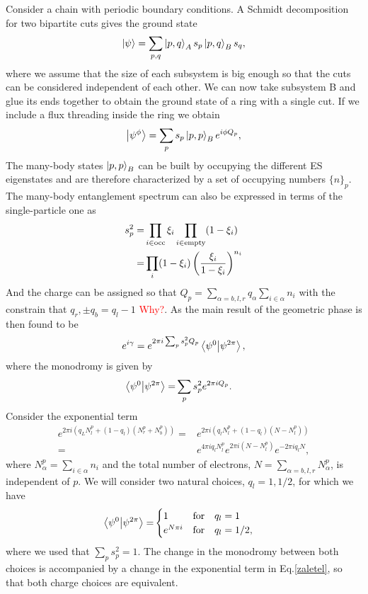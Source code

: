 \documentclass[prb,twocolumn,amsmath,amssymb,superscriptaddress]{revtex4-1}
\begin{document}
Consider a chain with periodic boundary conditions. A Schmidt decomposition for two bipartite cuts gives the ground state
\begin{equation}
\ket{\psi} = \sum_{p,q} \ket{p,q}_A s_p \ket{p,q}_B s_q,
\end{equation}
where we assume that the size of each subsystem is big enough so that the cuts can be considered independent of each other. We can now take subsystem B and glue its ends together to obtain the ground state of a ring with a single cut. If we include a flux threading inside the ring we obtain
\begin{equation}
\ket{\psi^\phi} = \sum_p s_p \ket{p,p}_B e^{i\phi Q_p},
\end{equation}
The many-body states $\ket{p,p}_B$ can be built by occupying the different ES eigenstates and are therefore characterized by a set of occupying numbers $\{n\}_p$. The many-body entanglement spectrum can also be expressed in terms of the single-particle one \cite{Alexandrinata2011} as
\begin{align}
s_p^2 =& \prod_{i \in {\rm occ}} \xi_i \prod_{i \in {\rm empty}}(1-\xi_i) \\
=& \prod_i (1-\xi_i)\left(\frac{\xi_i}{1-\xi_i} \right)^{n_i}
\end{align}
And the charge can be assigned so that $Q_p = \sum_{\alpha = b,l,r} q_\alpha\sum_{i \in \alpha} n_i$ with the constrain that $q_r,\pm q_b = q_l-1$ \textcolor{red}{Why?}. As the main result of \cite{Zaletel2014} the geometric phase is then found to be
\begin{align}
e^{i\gamma} = e^{2\pi i \sum_p s_p^2 Q_p}  \bra{\psi^0}\ket{\psi^{2\pi}},
\label{zaletel}
\end{align}
where the monodromy is given by
\begin{align}
\bra{\psi^0}\ket{\psi^{2\pi}} =& \sum_p s_p^2 e^{2\pi i Q_p}.
\end{align}
Consider the exponential term
\begin{align*}
e^{2\pi i (q_L N^p_l + (1-q_l)(N^p_r+N^p_b))} =& e^{2\pi i (q_l N^p_l + (1-q_l)(N-N^p_l))} \\
=& e^{4\pi i q_l N^p_l}e^{2 \pi i (N-N^p_l)}e^{-2\pi i q_l N },
\end{align*}
where $N^p_\alpha = \sum_{i \in \alpha} n_i$ and the total number of electrons, $N = \sum_{\alpha = b,l,r} N^p_\alpha$, is independent of $p$. We will consider two natural choices, $q_l = 1,1/2$, for which we have
\begin{align}
\bra{\psi^0}\ket{\psi^{2\pi}} =& 
\begin{cases}
1 & \text{for} \quad q_l = 1 \\
e^{N\pi i} & \text{for} \quad q_l = 1/2,
\end{cases}
\end{align}
where we used that $\sum_p s_p^2 = 1$. The change in the monodromy between both choices is accompanied by a change in the exponential term in Eq.\ref{zaletel}, so that both charge choices are equivalent.
\end{document}

